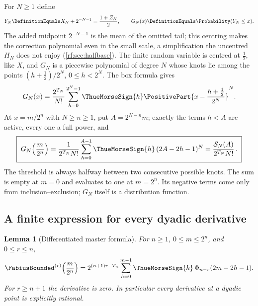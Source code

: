 \documentclass[11pt,oneside]{article}
\theoremstyle{plain}
\newtheorem{lemma}[theorem]{Lemma}
\theoremstyle{definition}
\theoremstyle{remark}
\newcommand{\Fb}{\FabiusBounded}            %
\newcommand{\tm}[1]{\ThueMorseSign{#1}}     %
\newcommand{\Prob}{\Probability}
\newcommand{\Spow}[2]{\mathcal{S}_{#1}(#2)} %
\newcommand{\Tr}[1]{T_{#1}}                 %
\begin{document}
For $N\ge1$ define
\begin{equation}
 Y_{N}\DefinitionEquals X_{N}+2^{-N-1}=\frac{1+Z_{N}}{2},\qquad
 G_{N}(x)\DefinitionEquals\Prob(Y_{N}\le x).
 \label{rf:eq:splines-centred}
\end{equation}
The added midpoint $2^{-N-1}$ is the mean of the omitted tail; this
centring makes the correction polynomial even in the small scale, a
simplification the uncentred $H_{N}$ does not enjoy
(\cref{rf:sec:halfbase}).  The finite random variable is centred at
$\tfrac12$, like $X$, and $G_{N}$ is a piecewise polynomial of degree $N$
whose knots lie among the points $(h+\tfrac12)/2^{N}$, $0\le h<2^{N}$.  The
box formula gives
\begin{equation}
 G_{N}(x)=\frac{2^{\Tr{N}}}{N!}\sum_{h=0}^{2^{N}-1}\tm{h}
 \PositivePart{x-\frac{h+\frac12}{2^{N}}}^{N}.
 \label{rf:eq:splines-G-positive}
\end{equation}
At $x=m/2^{n}$ with $N\ge n\ge1$, put $A=2^{N-n}m$; exactly the terms
$h<A$ are active, every one a full power, and
\begin{equation}
 \boxed{\;
 G_{N}\!\left(\frac{m}{2^{n}}\right)
 =\frac{1}{2^{\Tr{N}}N!}\sum_{h=0}^{A-1}\tm{h}\,(2A-2h-1)^{N}
 =\frac{\Spow{N}{A}}{2^{\Tr{N}}N!}\,.\;}
 \label{rf:eq:splines-G-integer}
\end{equation}
The threshold is always halfway between two consecutive possible knots.
The sum is empty at $m=0$ and evaluates to one at $m=2^{n}$.  Its negative
terms come only from inclusion--exclusion; $G_{N}$ itself is a distribution
function.

\subsection{A finite expression for every dyadic derivative}
\label{rf:sec:splines-derivatives}

\begin{lemma}[Differentiated master formula]
\label{rf:lem:splines-derivative-master}
For $n\ge1$, $0\le m\le2^{n}$, and $0\le r\le n$,
\begin{equation}
 \Fb^{(r)}\!\left(\frac{m}{2^{n}}\right)
 =2^{(n+1)r-\Tr{n}}\sum_{h=0}^{m-1}\tm{h}\,\Phi_{n-r}(2m-2h-1).
 \label{rf:eq:splines-derivative-master}
\end{equation}
For $r\ge n+1$ the derivative is zero.  In particular every derivative at a
dyadic point is explicitly rational.
\end{lemma}
\end{document}
